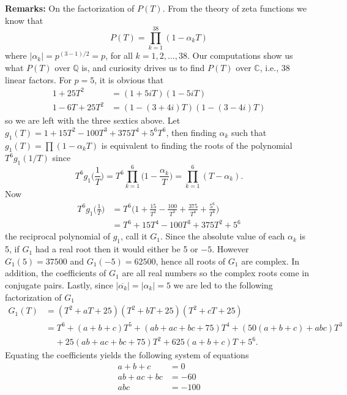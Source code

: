 \documentclass[10pt,oneside,reqno]{amsart}
\begin{document}
\begin{flushleft}
		\textbf{Remarks:} On the factorization of $P(T)$.
		\newline From the theory of zeta functions we know that
		\begin{equation*}
			P(T)=\prod_{k=1}^{38}(1-\alpha_k T)
		\end{equation*}
		where $|\alpha_k|=p^{(3-1)/2}=p$, for all $k=1,2,\dots,38$.  Our computations show us what $P(T)$ over $\mathbb{Q}$ is, and curiosity drives us to find $P(T)$ over $\mathbb{C}$, i.e., 38 linear factors.  For $p=5$, it is obvious that
		\begin{align*}
			1+25T^2 & =(1+5iT)(1-5iT) \\
			1-6T+25T^2 & =(1-(3+4i)T)(1-(3-4i)T)
		\end{align*}
		so we are left with the three sextics above.  Let $g_1(T)=1+15T^2-100T^3+375T^4+5^6T^6$, then finding $\alpha_k$ such that $g_1(T)=\prod(1-\alpha_k T)$ is equivalent to finding the roots of the polynomial $T^6g_1(1/T)$ since
		\begin{equation*}
			T^6g_1\Bigg(\frac{1}{T}\Bigg)=T^6\prod_{k=1}^{6}\Bigg(1-\frac{\alpha_k}{T}\Bigg)=\prod_{k=1}^{6}(T-\alpha_k).
		\end{equation*}
		Now
		\begin{align*}
			T^6g_1\Bigg(\frac{1}{T}\Bigg) & =T^6\Bigg(1+\frac{15}{T^2}-\frac{100}{T^3}+\frac{375}{T^4}+\frac{5^6}{T^6}\Bigg) \\
			& =T^6+15T^4-100T^3+375T^2+5^6
		\end{align*}
		the reciprocal polynomial of $g_1$, call it $G_1$.  Since the absolute value of each $\alpha_k$ is 5, if $G_1$ had a real root then it would either be 5 or $-5$.  However $G_1(5)=37500$ and $G_1(-5)=62500$, hence all roots of $G_1$ are complex.  In addition, the coefficients of $G_1$ are all real numbers so the complex roots come in conjugate pairs.  Lastly, since $|\overline{\alpha_k}|=|\alpha_k|=5$ we are led to the following factorization of $G_1$
		\begin{align*}
			G_1(T) & =(T^2+aT+25)(T^2+bT+25)(T^2+cT+25) \\
			& =T^6+(a+b+c)T^5+(ab+ac+bc+75)T^4+(50(a+b+c)+abc)T^3 \\
			& \;\;\;\;+25(ab+ac+bc+75)T^2+625(a+b+c)T+5^6.
		\end{align*}
		Equating the coefficients yields the following system of equations
		\begin{align*}
			a+b+c & =0 \\
			ab+ac+bc & =-60 \\
			abc & =-100

\end{align*}
\end{flushleft}
\end{document}
